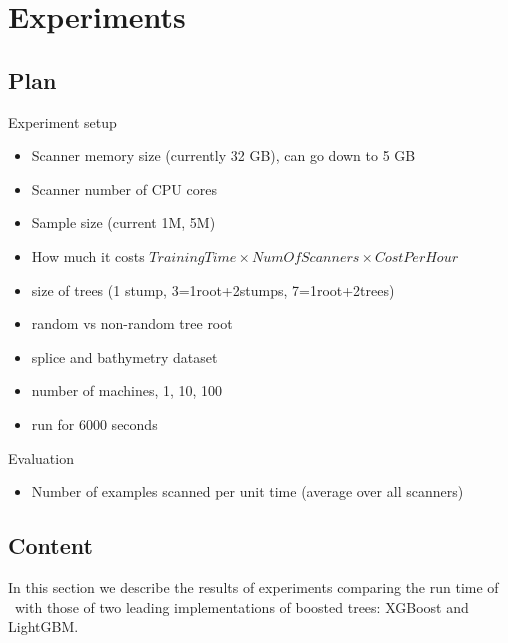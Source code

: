 \section{Experiments}\label{sec:experiments}

\subsection{Plan}

Experiment setup

\begin{itemize}
    \item Scanner memory size (currently 32 GB), can go down to 5 GB
    \item Scanner number of CPU cores
    \item Sample size (current 1M, 5M)
    \item How much it costs $TrainingTime \times NumOfScanners \times CostPerHour$
    \item size of trees (1 stump, 3=1root+2stumps, 7=1root+2trees)
    \item random vs non-random tree root
    \item splice and bathymetry dataset
    \item number of machines, 1, 10, 100
    \item run for 6000 seconds
\end{itemize}

Evaluation

\begin{itemize}
    \item Number of examples scanned per unit time (average over all scanners)
    
\end{itemize}

\subsection{Content}

In this section we describe the results of experiments comparing
the run time of \Sparrow\ with those of two leading implementations of
boosted trees: XGBoost and LightGBM.


